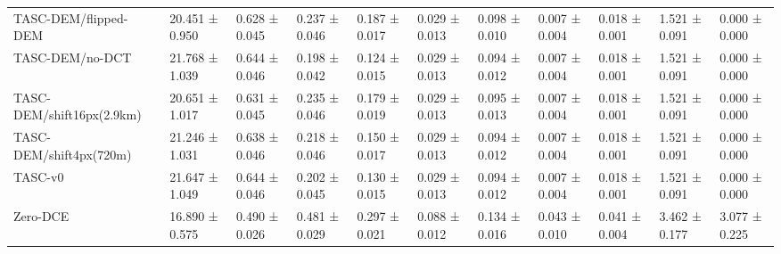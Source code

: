 \begin{table}[t]
\begin{tabular}{lllllllllll}
TASC-DEM/flipped-DEM & 20.451 ± 0.950 & 0.628 ± 0.045 & 0.237 ± 0.046 & 0.187 ± 0.017 & 0.029 ± 0.013 & 0.098 ± 0.010 & 0.007 ± 0.004 & 0.018 ± 0.001 & 1.521 ± 0.091 & 0.000 ± 0.000 \\
TASC-DEM/no-DCT & 21.768 ± 1.039 & 0.644 ± 0.046 & 0.198 ± 0.042 & 0.124 ± 0.015 & 0.029 ± 0.013 & 0.094 ± 0.012 & 0.007 ± 0.004 & 0.018 ± 0.001 & 1.521 ± 0.091 & 0.000 ± 0.000 \\
TASC-DEM/shift16px(2.9km) & 20.651 ± 1.017 & 0.631 ± 0.045 & 0.235 ± 0.046 & 0.179 ± 0.019 & 0.029 ± 0.013 & 0.095 ± 0.013 & 0.007 ± 0.004 & 0.018 ± 0.001 & 1.521 ± 0.091 & 0.000 ± 0.000 \\
TASC-DEM/shift4px(720m) & 21.246 ± 1.031 & 0.638 ± 0.046 & 0.218 ± 0.046 & 0.150 ± 0.017 & 0.029 ± 0.013 & 0.094 ± 0.012 & 0.007 ± 0.004 & 0.018 ± 0.001 & 1.521 ± 0.091 & 0.000 ± 0.000 \\
TASC-v0 & 21.647 ± 1.049 & 0.644 ± 0.046 & 0.202 ± 0.045 & 0.130 ± 0.015 & 0.029 ± 0.013 & 0.094 ± 0.012 & 0.007 ± 0.004 & 0.018 ± 0.001 & 1.521 ± 0.091 & 0.000 ± 0.000 \\
Zero-DCE & 16.890 ± 0.575 & 0.490 ± 0.026 & 0.481 ± 0.029 & 0.297 ± 0.021 & 0.088 ± 0.012 & 0.134 ± 0.016 & 0.043 ± 0.010 & 0.041 ± 0.004 & 3.462 ± 0.177 & 3.077 ± 0.225 \\
\bottomrule
\end{tabular}
\end{table}
